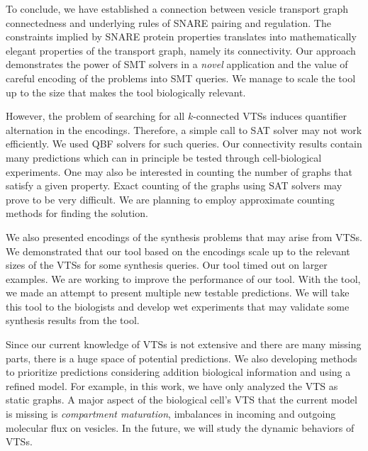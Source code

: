 \noindent 
To conclude, we have established a connection between vesicle transport graph connectedness and underlying rules of SNARE pairing and regulation. 
%
The constraints implied by SNARE protein properties translates into
mathematically elegant properties of the transport graph, namely its connectivity.
%
Our approach demonstrates the power of SMT solvers in a {\em novel} application and the value of careful encoding of the problems into SMT queries. 
We manage to scale the tool up to the size that makes the tool biologically relevant.
%

However, the problem of searching for all $k$-connected VTSs induces quantifier alternation in the encodings.
%
Therefore, a simple call to SAT solver may not work efficiently. 
%
We used QBF solvers for such queries.
%
Our connectivity results contain many predictions which can in principle be tested through cell-biological experiments. 
%
One may also be interested in counting the number of graphs that satisfy
a given property. 
%
Exact counting of the graphs using SAT solvers may prove to be very
difficult. 
%
We are planning to employ approximate counting methods for finding the solution.
%

We also presented encodings of the synthesis problems that may arise from VTSs.
%
We demonstrated that our tool based on the encodings
scale up to the relevant sizes of the VTSs for some synthesis queries.
%
Our tool timed out on larger examples.
%
We are working to improve the performance of our tool.
%
%
With the tool, we made an attempt to present multiple new testable predictions. 
%
We will take this tool to the biologists and develop wet experiments that may
validate some synthesis results from the tool.
%
%

Since our current knowledge of VTSs is not extensive and there are many missing parts,
there is a huge space of potential predictions.
%
We also developing methods to prioritize predictions considering addition biological
information and using a refined model.
%
For example, in this work, we have only analyzed the VTS as static graphs. A major aspect of the biological cell’s VTS that the current model is missing is \textit{compartment maturation}, imbalances in incoming and outgoing molecular flux on vesicles.
%
In the future, we will study the dynamic behaviors of VTSs.

